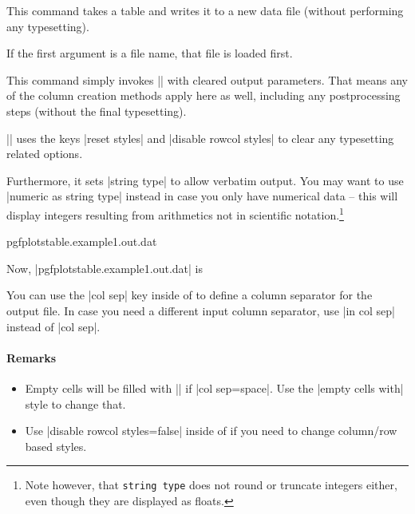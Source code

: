 \documentclass[a4paper]{ltxdoc}
\begin{document}
\begin{command}{\pgfplotstablesave{}}
    This command takes a table and writes it to a new data file (without
    performing any typesetting).

    If the first argument is a file name, that file is loaded first.

    This command simply invokes |\pgfplotstabletypeset| with cleared output
    parameters. That means any of the column creation methods apply here as
    well, including any postprocessing steps (without the final typesetting).

    |\pgfplotstablesave| uses the keys |reset styles| and
    |disable rowcol styles| to clear any typesetting related options.

    Furthermore, it sets |string type| to allow verbatim output. You may want
    to use |numeric as string type| instead in case you only have numerical
    data -- this will display integers resulting from arithmetics not in
    scientific notation.\footnote{Note however, that \texttt{string type} does
    not round or truncate integers either, even though they are displayed as
    floats.}
\begin{codeexample}[]
    {pgfplotstable.example1.out.dat}
\end{codeexample}
    Now, |pgfplotstable.example1.out.dat| is
    

    You can use the |col sep| key inside of  to define a column
    separator for the output file. In case you need a different input column
    separator, use |in col sep| instead of |col sep|.


    \paragraph{Remarks}

    \begin{itemize}
        \item Empty cells will be filled with |{}| if |col sep=space|. Use
            the |empty cells with| style to change that.
        \item Use |disable rowcol styles=false| inside of  if
            you need to change column/row based styles.
    \end{itemize}
\end{command}
\end{document}
